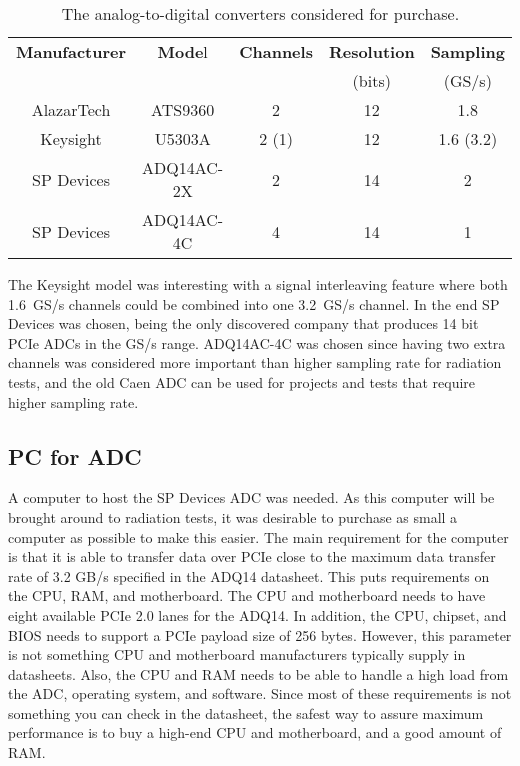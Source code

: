 \documentclass[../main/thesis.tex]{subfiles}
\begin{document}
\begin{table}[h]
\begin{center}
	\caption{The analog-to-digital converters considered for purchase.}
	\label{tab-adc}
	\begin{tabular}{ccccc}%
		\toprule %
		\textbf{Manufacturer} & \textbf{Mode}l & \textbf{Channels} & \textbf{Resolution} & \textbf{Sampling} \\ 
		 & & & (bits) & (GS/s) \\ \midrule%
		AlazarTech & ATS9360 & 2 & 12 & 1.8 \\ %
		Keysight & U5303A & 2 (1) & 12 & 1.6 (3.2) \\ %
		SP Devices & ADQ14AC-2X & 2 & 14 & 2 \\ %
		SP Devices & ADQ14AC-4C & 4 & 14 & 1 \\ \bottomrule%
	\end{tabular}
\end{center}
\end{table}

The Keysight model was interesting with a signal interleaving feature where both 1.6~GS/s channels could be combined into one 3.2~GS/s channel. In the end SP Devices was chosen, being the only discovered company that produces 14 bit \gls{PCIe} \gls{ADC}s in the GS/s range. ADQ14AC-4C was chosen since having two extra channels was considered more important than higher sampling rate for radiation tests, and the old Caen \gls{ADC} can be used for projects and tests that require higher sampling rate. 

\subsection{PC for ADC}
\label{e-adc-pc}
A computer to host the SP Devices \gls{ADC} was needed. As this computer will be brought around to radiation tests, it was desirable to purchase as small a computer as possible to make this easier. The main requirement for the computer is that it is able to transfer data over \gls{PCIe} close to the maximum data transfer rate of 3.2 GB/s specified in the ADQ14 datasheet. This puts requirements on the CPU, RAM, and motherboard. The CPU and motherboard needs to have eight available \gls{PCIe} 2.0 lanes for the ADQ14. In addition, the CPU, chipset, and BIOS needs to support a \gls{PCIe} payload size of 256 bytes. However, this parameter is not something CPU and motherboard manufacturers typically supply in datasheets. Also, the CPU and RAM needs to be able to handle a high load from the ADC, operating system, and software. Since most of these requirements is not something you can check in the datasheet, the safest way to assure maximum performance is to buy a high-end CPU and motherboard, and a good amount of RAM.
\end{document}
